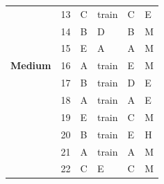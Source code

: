 \documentclass[pageno]{final_paper}
\begin{document}
\begin{table}[]
\begin{tabular}{llllll}
\textbf{}                & 13                                  & C                                          & train                                       & C                                           & E                                       \\
\textbf{}                & 14                                  & B                                          & D                                           & B                                           & M                                       \\
\textbf{}                & 15                                  & E                                          & A                                           & A                                           & M                                       \\
\textbf{Medium}          & 16                                  & A                                          & train                                       & E                                           & M                                       \\
\textbf{}                & 17                                  & B                                          & train                                       & D                                           & E                                       \\
\textbf{}                & 18                                  & A                                          & train                                       & A                                           & E                                       \\
\textbf{}                & 19                                  & E                                          & train                                       & C                                           & M                                       \\
\textbf{}                & 20                                  & B                                          & train                                       & E                                           & H                                       \\
\textbf{}                & 21                                  & A                                          & train                                       & A                                           & M                                       \\
\textbf{}                & 22                                  & C                                          & E                                           & C                                           & M                                       \\

\end{tabular}
\end{table}
\end{document}
